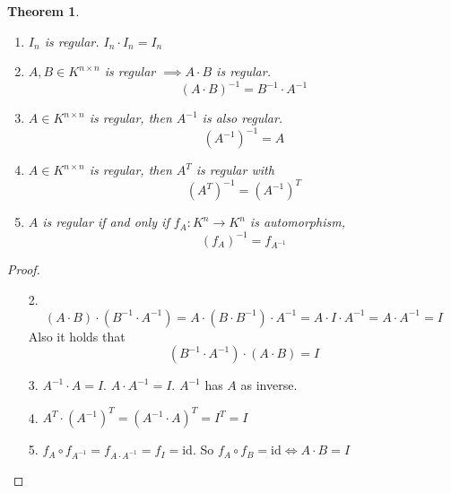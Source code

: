 \documentclass[a4paper,landscape,twocolumn]{article}
\newtheorem{theorem}{Theorem}[section]
\begin{document}
\begin{theorem}
  \label{theorem-6.14}
  \begin{enumerate}
    \item $I_n$ is regular. $I_n \cdot I_n = I_n$
    \item $A, B \in K^{n\times n}$ is regular $\implies A \cdot B$ is regular.
      \[ \left(A \cdot B\right)^{-1} = B^{-1} \cdot A^{-1} \]
    \item $A \in K^{n\times n}$ is regular, then $A^{-1}$ is also regular.
      \[ \left(A^{-1}\right)^{-1} = A \]
    \item $A \in K^{n\times n}$ is regular, then $A^T$ is regular with
      \[ \left(A^T\right)^{-1} = \left(A^{-1}\right)^T \]
    \item $A$ is regular if and only if $f_A: K^n \to K^n$ is automorphism,
      \[ \left(f_A\right)^{-1} = f_{A^{-1}} \]
  \end{enumerate}
\end{theorem}
\begin{proof}
  \begin{enumerate}
    \item[2.] \[
        (A \cdot B) \cdot (B^{-1} \cdot A^{-1})
        = A \cdot (B \cdot B^{-1}) \cdot A^{-1}
        = A \cdot I \cdot A^{-1}
        = A \cdot A^{-1}
        = I
      \]
      Also it holds that
      \[ (B^{-1} \cdot A^{-1}) \cdot (A \cdot B) = I \]
    \item[3.] $A^{-1} \cdot A = I$. $A \cdot A^{-1} = I$.
      $A^{-1}$ has $A$ as inverse.
    \item[4.] $A^T \cdot (A^{-1})^T = \left(A^{-1} \cdot A\right)^T = I^T = I$
    \item[5.] $f_A \circ f_{A^{-1}} = f_{A \cdot A^{-1}} = f_I = \text{id}$.
      So $f_A \circ f_B = \text{id} \iff A \cdot B = I$
  \end{enumerate}
\end{proof}
\end{document}
